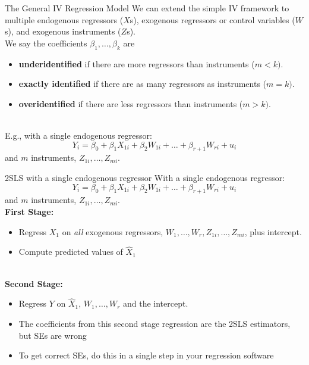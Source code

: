 \documentclass[notes,10pt, aspectratio=169]{beamer}
\begin{document}
\begin{frame}{The General  IV  Regression Model }
We can extend the simple IV framework to multiple endogenous regressors ($X$s), exogenous regressors or control variables ($W$s), and exogenous instruments ($Z$s).\\[1em]
We say the coefficients $\beta_1, \dots, \beta_k$ are
\begin{itemize}
    \item \textbf{underidentified} if there are more regressors than instruments ($m<k)$.
    \item \textbf{exactly identified} if there are as many regressors as instruments ($m=k)$.
    \item \textbf{overidentified} if there are less regressors than instruments ($m>k)$.
\end{itemize}\\[1em]
E.g., with a single endogenous regressor:
\begin{equation*}
    Y_i = \beta_0 + \beta_1 X_{1i} + \beta_2 W_{1i} + \dots + \beta_{r+1} W_{ri} + u_i
\end{equation*}
and $m$ instruments, $Z_{1i}, \dots,Z_{mi}$.
\end{frame}

\begin{frame}{2SLS with a single endogenous regressor}
With a single endogenous regressor:
\begin{equation*}
    Y_i = \beta_0 + \beta_1 X_{1i} + \beta_2 W_{1i} + \dots + \beta_{r+1} W_{ri} + u_i
\end{equation*}
and $m$ instruments, $Z_{1i}, \dots,Z_{mi}$.\\[1em]

\textbf{First Stage:}\\
\begin{itemize}
    \item Regress $X_{1}$ on \textit{all} exogenous regressors, $W_{1}, \dots, W_{r}, Z_{1i}, \dots,Z_{mi}$, plus intercept.
    \item Compute predicted values of $\hat{X}_1$
\end{itemize}\\[1em]
\textbf{Second Stage:}\\
\begin{itemize}
    \item Regress $Y$ on $\hat{X}_1$, $W_{1}, \dots, W_{r}$ and the intercept.
    \item The coefficients from this second stage regression are the 2SLS estimators, but SEs are wrong
    \item To get correct SEs, do this in a single step in your regression software
\end{itemize}
\end{frame}
\end{document}
